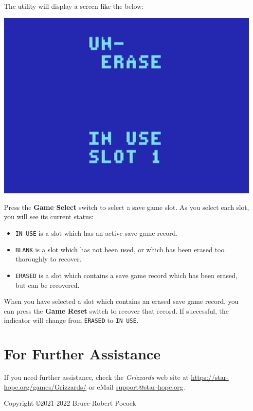 \documentclass[article]{memoir}
\begin{document}
The utility will display a screen like the below:

\includegraphics[width=\columnwidth]{../Manual/Unerase.png}

Press the \textbf{Game Select} switch to select a save game slot. As you
select each slot, you will see its current status:

\begin{itemize}
\item \texttt{IN USE} is a slot which has an active save game record.
\item \texttt{BLANK}  is a slot  which has not  been used, or  which has
  been erased too thoroughly to recover.
\item \texttt{ERASED} is a slot which  contains a save game record which
  has been erased, but can be recovered.
\end{itemize}

When you have selected a slot which contains an erased save game record,
you can  press the  \textbf{Game Reset} switch  to recover  that record.
If  successful,  the  indicator  will  change  from  \texttt{ERASED}  to
\texttt{IN USE}.

\section*{For Further Assistance}

If you need further assistance, check the \textit{Grizzards} web site at
\href{https://star-hope.org/games/Grizzards/}{https://\-star-hope.org/\-games/\-Grizzards/}
or eMail \href{mailto:support@star-hope.org}{support@star-hope.org}.

\vfill

Copyright \copyright 2021-2022 Bruce-Robert Pocock
\end{document}
